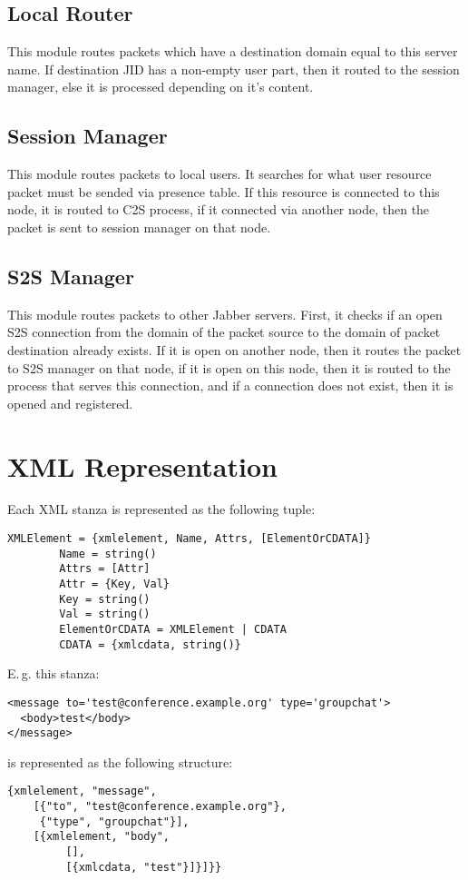 \documentclass[a4paper,10pt]{article}
\newcommand{\Jabber}{Jabber}
\begin{document}
\subsection{Local Router}

This module routes packets which have a destination domain equal to this server
name.  If destination JID has a non-empty user part, then it routed to the
session manager, else it is processed depending on it's content.


\subsection{Session Manager}

This module routes packets to local users.  It searches for what user resource
packet must be sended via presence table.  If this resource is connected to
this node, it is routed to C2S process, if it connected via another node, then
the packet is sent to session manager on that node.


\subsection{S2S Manager}

This module routes packets to other \Jabber{} servers.  First, it checks if an
open S2S connection from the domain of the packet source to the domain of
packet destination already exists. If it is open on another node, then it
routes the packet to S2S manager on that node, if it is open on this node, then
it is routed to the process that serves this connection, and if a connection
does not exist, then it is opened and registered.




\section{XML Representation}
\label{sec:xmlrepr}

Each XML stanza is represented as the following tuple:
\begin{verbatim}
XMLElement = {xmlelement, Name, Attrs, [ElementOrCDATA]}
        Name = string()
        Attrs = [Attr]
        Attr = {Key, Val}
        Key = string()
        Val = string()
        ElementOrCDATA = XMLElement | CDATA
        CDATA = {xmlcdata, string()}
\end{verbatim}
E.\,g. this stanza:
\begin{verbatim}
<message to='test@conference.example.org' type='groupchat'>
  <body>test</body>
</message>
\end{verbatim}
is represented as the following structure:
\begin{verbatim}
{xmlelement, "message",
    [{"to", "test@conference.example.org"},
     {"type", "groupchat"}],
    [{xmlelement, "body",
         [],
         [{xmlcdata, "test"}]}]}}
\end{verbatim}
\end{document}
